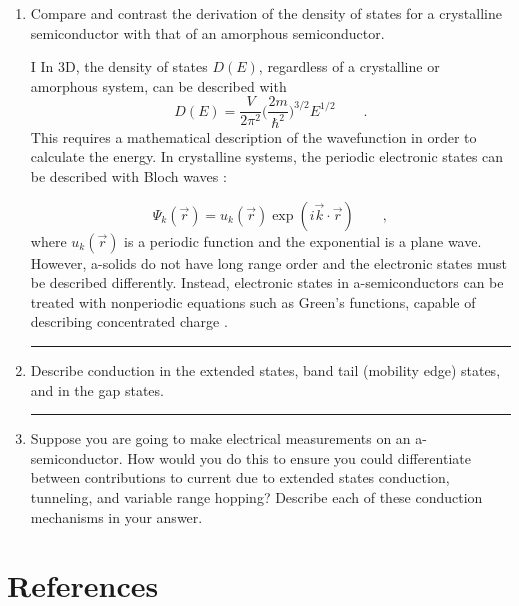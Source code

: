 \documentclass[12pt]{elsarticle}
\newcommand{\vs}{\vspace{2mm}}
\newcommand{\fullline}{\noindent\rule{14cm}{0.4pt} \vspace{4mm}}
\begin{document}
\begin{enumerate}
\fullline

\item Compare and contrast the derivation of the density of states for a crystalline
semiconductor with that of an amorphous semiconductor.
\par \vs 
I
In 3D, the density of states $D(E)$, regardless of a crystalline or amorphous system, can be described with 
\begin{equation}
D(E)=\frac{V}{2\pi^2}\bigg(\frac{2m}{\hbar ^2}\bigg)^{3/2}E^{1/2} \qquad .
\end{equation}
This requires a mathematical description of the wavefunction in order to calculate the energy.
In crystalline systems, the periodic electronic states can be described with Bloch waves \cite{Lee2012}:

\begin{equation}
\Psi_{k}(\vec{r})=u_{k}(\vec{r})\exp(i\vec{k}\cdot\vec{r}) \qquad ,
\end{equation}
where $u_{k}(\vec{r})$ is a periodic function and the exponential is a plane wave. However, a-solids do not have long range order and the electronic states must be described differently. Instead, electronic states in a-semiconductors can be treated with nonperiodic equations such as Green's functions, capable of describing concentrated charge \cite{Stover}.





\fullline




\item Describe conduction in the extended states, band tail (mobility edge) states, and in the
gap states. 
\par 
\fullline

\item Suppose you are going to make electrical measurements on an a-semiconductor. How
would you do this to ensure you could differentiate between contributions to current due
to extended states conduction, tunneling, and variable range hopping? Describe each of
these conduction mechanisms in your answer.




\end{enumerate}


\section*{References}


\end{document}
